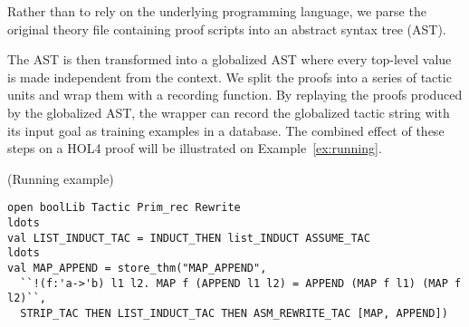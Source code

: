 \documentclass[runningheads,a4paper,draft]{svjour3}
\def\holfour{\textsf{HOL4}\xspace}
\begin{document}


Rather than to rely on the underlying programming language, we parse the
original theory file containing proof scripts into an
abstract syntax tree (AST).


 The AST is then transformed into a globalized AST
where every top-level value is made independent from
the context.  We 
split the proofs into a series of tactic units and wrap them 
with a recording function.
By replaying the proofs produced by the globalized AST, the wrapper can
record the globalized tactic string with its input goal as training examples in
a database.
The combined effect of these steps on a \holfour proof will be illustrated on Example~\ref{ex:running}.

\begin{example}\label{ex:running}(Running example)
\small
\begin{lstlisting}[language=SMLSmall,frame=tb]
open boolLib Tactic Prim_rec Rewrite
ldots
val LIST_INDUCT_TAC = INDUCT_THEN list_INDUCT ASSUME_TAC
ldots
val MAP_APPEND = store_thm("MAP_APPEND",
  ``!(f:'a->'b) l1 l2. MAP f (APPEND l1 l2) = APPEND (MAP f l1) (MAP f l2)``,
  STRIP_TAC THEN LIST_INDUCT_TAC THEN ASM_REWRITE_TAC [MAP, APPEND])
\end{lstlisting}
\end{example} 
\end{document}
